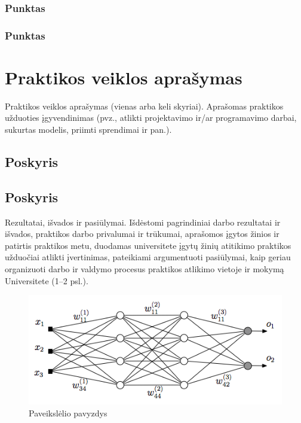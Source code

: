 \documentclass{VUMIFPSBakPrakAt}
\begin{document}
\subsubsection{Punktas}
\subsubsection{Punktas}

\section{Praktikos veiklos aprašymas}
Praktikos veiklos aprašymas (vienas arba keli skyriai). Aprašomas praktikos užduoties
įgyvendinimas (pvz., atlikti projektavimo ir/ar programavimo darbai, sukurtas modelis, priimti
sprendimai ir pan.).

\subsection{Poskyris}
\subsection{Poskyris}

Rezultatai, išvados ir pasiūlymai. Išdėstomi pagrindiniai darbo rezultatai ir išvados, praktikos
darbo privalumai ir trūkumai, aprašomos įgytos žinios ir patirtis praktikos metu, duodamas
universitete įgytų žinių atitikimo praktikos užduočiai atlikti įvertinimas, pateikiami argumentuoti
pasiūlymai, kaip geriau organizuoti darbo ir valdymo procesus praktikos atlikimo vietoje ir
mokymą Universitete (1--2 psl.).

\printbibliography[heading=bibintoc]


\begin{figure}[H]
    \centering
    \includegraphics[scale=0.5]{img/MLP}
    \caption{Paveikslėlio pavyzdys}
    \label{img:mlp}
\end{figure}
\end{document}
